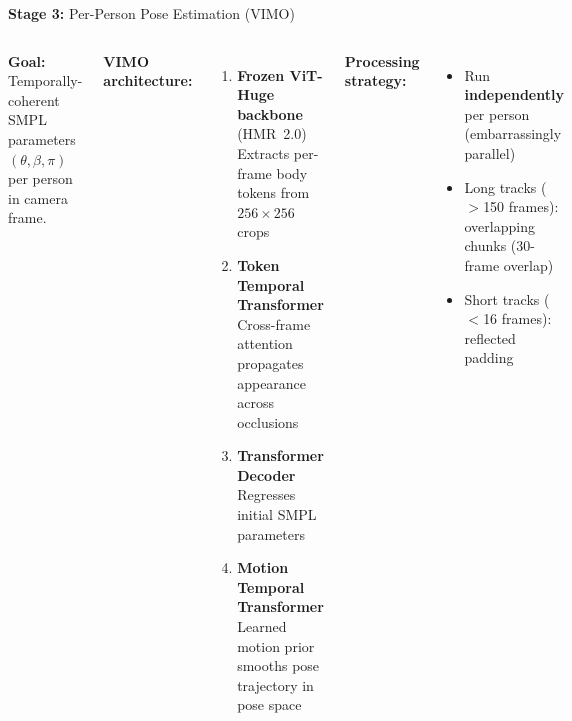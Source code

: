 \documentclass[aspectratio=169,11pt]{beamer}
\newcommand{\stage}[2]{\textcolor{accentblue}{\textbf{Stage #1:}} #2}
\begin{document}
\begin{frame}{\stage{3}{Per-Person Pose Estimation (VIMO)}}
  \begin{columns}[T]
      \textbf{Goal:} Temporally-coherent SMPL parameters $(\theta, \beta, \pi)$
      per person in camera frame.

      \vspace{0.5em}
      \textbf{VIMO architecture:}
      \begin{enumerate}
        \item \textbf{Frozen ViT-Huge backbone} (HMR~2.0)\\
          {\small Extracts per-frame body tokens from $256{\times}256$ crops}
        \item \textbf{Token Temporal Transformer}\\
          {\small Cross-frame attention propagates appearance across occlusions}
        \item \textbf{Transformer Decoder}\\
          {\small Regresses initial SMPL parameters}
        \item \textbf{Motion Temporal Transformer}\\
          {\small Learned motion prior smooths pose trajectory in pose space}
      \end{enumerate}

      \vspace{0.4em}
      \textbf{Processing strategy:}
      \begin{itemize}
        \item Run \textbf{independently} per person (embarrassingly parallel)
        \item Long tracks ($>$150 frames): overlapping chunks (30-frame overlap)
        \item Short tracks ($<$16 frames): reflected padding
      \end{itemize}


\end{columns}
\end{frame}
\end{document}
